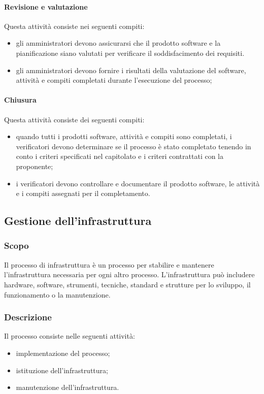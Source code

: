 		\paragraph{Revisione e valutazione}
		Questa attività consiste nei seguenti compiti:
		\begin{itemize}
			\item gli amministratori devono assicurarsi che il prodotto software e la pianificazione siano valutati per verificare il soddisfacimento dei requisiti.
			\item gli amministratori devono fornire i risultati della valutazione del software, attività e compiti completati durante l'esecuzione del processo;
		\end{itemize}
		\paragraph{Chiusura}
		Questa attività consiste dei seguenti compiti:
		\begin{itemize}
			\item quando tutti i prodotti software, attività e compiti sono completati, i verificatori devono determinare se il processo è stato completato tenendo in conto i criteri specificati nel capitolato e i criteri contrattati con la proponente;
			\item i verificatori devono controllare e documentare il prodotto software, le attività e i compiti assegnati per il completamento.
		\end{itemize}
		
		
		\subsection{Gestione dell'infrastruttura}
		\subsubsection{Scopo}
		Il processo di infrastruttura è un processo per stabilire e mantenere l'infrastruttura necessaria per ogni altro processo. L'infrastruttura può includere hardware, software, strumenti, tecniche, standard e strutture per lo sviluppo, il funzionamento o la manutenzione. 
		
		\subsubsection{Descrizione}
		
		Il processo consiste nelle seguenti attività:
		\begin{itemize}
			\item implementazione del processo;
			\item istituzione dell'infrastruttura;
			\item manutenzione dell'infrastruttura.
		\end{itemize}
		
